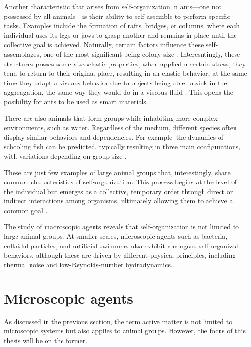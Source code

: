 Another characteristic that arises from self-organization in ants—one not possessed by all animals—is their ability to self-assemble to perform specific tasks. Examples include the formation of rafts, bridges, or columns, where each individual uses its legs or jaws to grasp another and remains in place until the collective goal is achieved. Naturally, certain factors influence these self-assemblages, one of the most significant being colony size \cite{anderson2002self}. Interesntingly, these structures posses some viscoelastic properties, when applied a certain stress, they tend to return to their original place, resulting in an elastic behavior, at the same time they adapt a viscous behavior due to objects being able to sink in the aggreagation, the same way they would do in a viscous fluid \cite{tennenbaum2016mechanics}. This opens the posibility for ants to be used as smart materials. 

There are also animals that form groups while inhabiting more complex environments, such as water. Regardless of the medium, different species often display similar behaviors and dependencies. For example, the dynamics of schooling fish can be predicted, typically resulting in three main configurations, with variations depending on group size \cite{tunstrom2013collective, katz2011inferring, huang2024collective}.

These are just few examples of large animal groups that, interestingly, share common characteristics of self-organization. This process begins at the level of the individual but emerges as a collective, temporary order through direct or indirect interactions among organisms, ultimately allowing them to achieve a common goal \cite{isaeva2012self}.

The study of macroscopic agents reveals that self-organization is not limited to large animal groups. At smaller scales, microscopic agents such as bacteria, colloidal particles, and artificial swimmers also exhibit analogous self-organized behaviors, although these are driven by different physical principles, including thermal noise and low-Reynolds-number hydrodynamics.

\section{Microscopic agents}

As discussed in the previous section, the term active matter is not limited to microscopic systems but also applies to animal groups. However, the focus of this thesis will be on the former.

